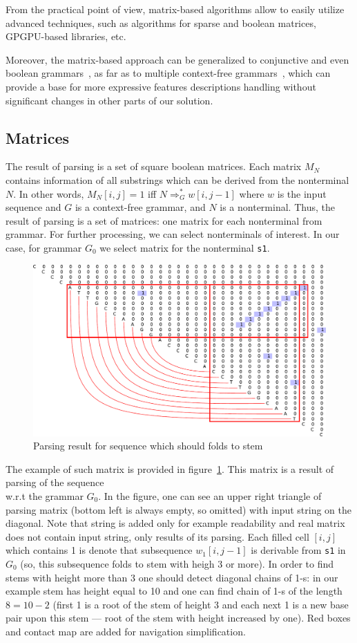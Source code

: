 \documentclass[a4paper,twoside]{article}
\begin{document}
From the practical point of view, matrix-based algorithms allow to easily utilize advanced techniques, such as algorithms for sparse and boolean matrices, GPGPU-based libraries, etc.

Moreover, the matrix-based approach can be generalized to conjunctive and even boolean grammars~\cite{OKHOTIN2014101}, as far as to multiple context-free grammars~\cite{mcfgMatrices}, which can provide a base for more expressive features descriptions handling without significant changes in other parts of our solution.

\subsection{Matrices}

\noindent The result of parsing is a set of square boolean matrices. 
Each matrix $M_N$ contains information of all substrings which can be derived from the nonterminal $N$.
In other words, $M_N[i,j]=1$ iff $N \Rightarrow^*_G w[i,j-1]$ where $w$ is the input sequence and $G$ is a context-free grammar, and $N$ is a nonterminal.
Thus, the result of parsing is a set of matrices: one matrix for each nonterminal from grammar.
For further processing, we can select nonterminals of interest.
In our case, for grammar $G_0$ we select matrix for the nonterminal \verb|s1|.

\begin{figure}
\centering
\includegraphics[width=.45\textwidth]{figures/4.pdf}
\caption{Parsing result for sequence which should folds to stem}
\label{fig:matrix-simple-stem}
\end{figure}

The example of such matrix is provided in figure~\ref{fig:matrix-simple-stem}.
This matrix is a result of parsing of the sequence {  \\} w.r.t the grammar $G_0$.
In the figure, one can see an upper right triangle of parsing matrix (bottom left is always empty, so omitted) with input string on the diagonal.
Note that string is added only for example readability and real matrix does not contain input string, only results of its parsing.
Each filled cell $[i,j]$ which contains 1 is denote that subsequence $w_1[i,j-1]$ is derivable from \verb|s1| in $G_0$ (so, this subsequence folds to stem with heigh 3 or more).
In order to find stems with height more than 3 one should detect diagonal chains of 1-s: in our example stem has height equal to 10 and one can find chain of 1-s of the length $8=10-2$ (first 1 is a root of the stem of height 3 and each next 1 is a new base pair upon this stem --- root of the stem with height increased by one).
Red boxes and contact map are added for navigation simplification.
\end{document}
